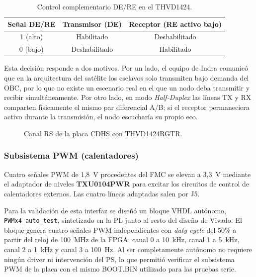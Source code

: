 \begin{table}[H]
    \centering
    \begin{tabular}{ccc}
        \hline
        \textbf{Señal DE/RE} & \textbf{Transmisor (DE)} & \textbf{Receptor (RE activo bajo)} \\
        \hline
        1 (alto) & Habilitado & Deshabilitado \\
        0 (bajo) & Deshabilitado & Habilitado \\
        \hline
    \end{tabular}
    \caption{Control complementario DE/RE en el THVD1424.}
    \label{tab:de_re}
\end{table}

Esta decisión responde a dos motivos. Por un lado, el equipo de Indra comunicó que en la
arquitectura del satélite los esclavos solo transmiten bajo demanda del OBC, por lo que no
existe un escenario real en el que un nodo deba transmitir y recibir simultáneamente. Por
otro lado, en modo \textit{Half-Duplex} las líneas TX y RX comparten físicamente el mismo par
diferencial A/B; si el receptor permaneciera activo durante la transmisión, el nodo escucharía
su propio eco.

\begin{figure}[H]
    \centering
    \caption{Canal RS de la placa CDHS con THVD1424RGTR.}
    \label{fig:cdhs_rs}
\end{figure}

\subsubsection{Subsistema PWM (calentadores)}

Cuatro señales PWM de 1,8~V procedentes del FMC se elevan a 3,3~V mediante el adaptador
de niveles \textbf{TXU0104PWR} para excitar los circuitos de control de calentadores externos.
Las cuatro líneas adaptadas salen por J5.

Para la validación de esta interfaz se diseñó un bloque VHDL autónomo,
\texttt{PWMx4\_auto\_test}, sintetizado en la PL junto al resto del diseño de Vivado. El bloque
genera cuatro señales PWM independientes con \textit{duty cycle} del 50\% a partir del reloj de
100~MHz de la FPGA: canal 0 a 10~kHz, canal 1 a 5~kHz, canal 2 a 1~kHz y canal 3 a
100~Hz. Al ser completamente autónomo no requiere ningún driver ni intervención del PS, lo
que permitió verificar el subsistema PWM de la placa con el mismo BOOT.BIN utilizado para
las pruebas serie.

